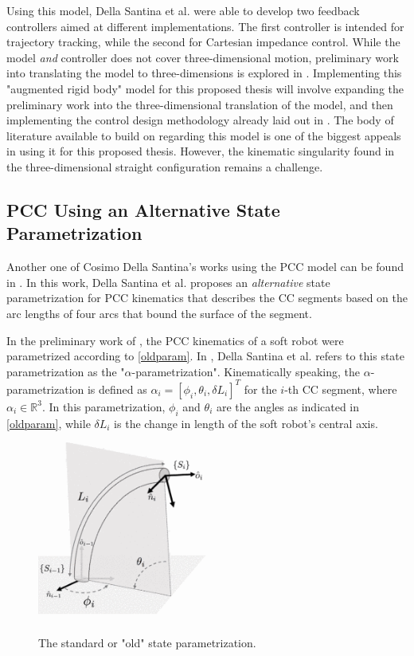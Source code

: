 Using this model, Della Santina et al. were able to develop two feedback controllers aimed at different implementations. The first controller is intended for trajectory tracking, while the second for Cartesian impedance control. While the model \textit{and} controller does not cover three-dimensional motion, preliminary work into translating the model to three-dimensions is explored in \cite{katzschmann_dynamic_2019}. Implementing this "augmented rigid body" model for this proposed thesis will involve expanding the preliminary work into the three-dimensional translation of the model, and then implementing the control design methodology already laid out in \cite{della_santina_model-based_2020}. The body of literature available to build on regarding this model is one of the biggest appeals in using it for this proposed thesis. However, the kinematic singularity found in the three-dimensional straight configuration remains a challenge.
\subsection{PCC Using an Alternative State Parametrization} \label{altpccdef}
Another one of Cosimo Della Santina's works using the PCC model can be found in \cite{della_santina_improved_2020}. In this work, Della Santina et al. proposes an \textit{alternative} state parametrization for PCC kinematics that describes the CC segments based on the arc lengths of four arcs that bound the surface of the segment.

In the preliminary work of \cite{katzschmann_dynamic_2019}, the PCC kinematics of a soft robot were parametrized according to \autoref{oldparam}. In \cite{della_santina_improved_2020}, Della Santina et al. refers to this state parametrization as the "$\alpha$-parametrization". Kinematically speaking, the $\alpha$-parametrization is defined as $\alpha_i = [\phi_i, \theta_i,\delta L_i]^T$ for the $i$-th CC segment, where $\alpha_i \in \mathbb{R}^3$. In this parametrization, $\phi_i$ and $\theta_i$ are the angles as indicated in \autoref{oldparam}, while $\delta L_i$ is the change in length of the soft robot's central axis. 

\begin{figure}[h!]
    \centering
    \includegraphics[width=0.5\textwidth]{graphics/oldparam.png}\
    \caption{The standard or "old" state parametrization. }
    \label{oldparam}
\end{figure}


